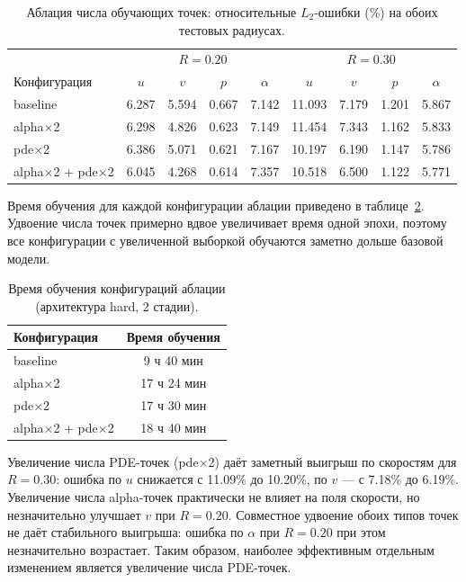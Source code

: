\documentclass[12pt,a4paper]{article}
\begin{document}
\begin{table}[H]
    \centering
    \begin{tabular}{l|cccc|cccc}
        \hline
        & \multicolumn{4}{c|}{\(R=0.20\)} & \multicolumn{4}{c}{\(R=0.30\)} \\
        Конфигурация & \(u\) & \(v\) & \(p\) & \(\alpha\) & \(u\) & \(v\) & \(p\) & \(\alpha\) \\
        \hline
        baseline                          & 6.287 & 5.594 & 0.667 & 7.142 & 11.093 & 7.179 & 1.201 & 5.867 \\
        alpha$\times$2                    & 6.298 & 4.826 & 0.623 & 7.149 & 11.454 & 7.343 & 1.162 & 5.833 \\
        pde$\times$2                      & 6.386 & 5.071 & 0.621 & 7.167 & 10.197 & 6.190 & 1.147 & 5.786 \\
        alpha$\times$2 + pde$\times$2     & 6.045 & 4.268 & 0.614 & 7.357 & 10.518 & 6.500 & 1.122 & 5.771 \\
        \hline
    \end{tabular}
    \caption{Аблация числа обучающих точек: относительные \(L_2\)-ошибки (\%) на обоих тестовых радиусах.}
    \label{tab:ablation}
\end{table}

Время обучения для каждой конфигурации аблации приведено в
таблице~\ref{tab:ablation_time}. Удвоение числа точек примерно вдвое увеличивает
время одной эпохи, поэтому все конфигурации с увеличенной выборкой обучаются
заметно дольше базовой модели.

\begin{table}[H]
    \centering
    \begin{tabular}{l|c}
        \hline
        Конфигурация & Время обучения \\
        \hline
        baseline              & 9 ч 40 мин \\
        alpha$\times$2        & 17 ч 24 мин \\
        pde$\times$2          & 17 ч 30 мин \\
        alpha$\times$2 + pde$\times$2 & 18 ч 40 мин \\
        \hline
    \end{tabular}
    \caption{Время обучения конфигураций аблации (архитектура hard, 2 стадии).}
    \label{tab:ablation_time}
\end{table}

Увеличение числа PDE-точек (pde$\times$2) даёт заметный выигрыш по скоростям
для \(R=0.30\): ошибка по \(u\) снижается с 11.09\% до 10.20\%, по \(v\) ---
с 7.18\% до 6.19\%. Увеличение числа alpha-точек практически не влияет на
поля скорости, но незначительно улучшает \(v\) при \(R=0.20\). Совместное
удвоение обоих типов точек не даёт стабильного выигрыша: ошибка по \(\alpha\)
при \(R=0.20\) при этом незначительно возрастает. Таким образом, наиболее
эффективным отдельным изменением является увеличение числа PDE-точек.
\end{document}
